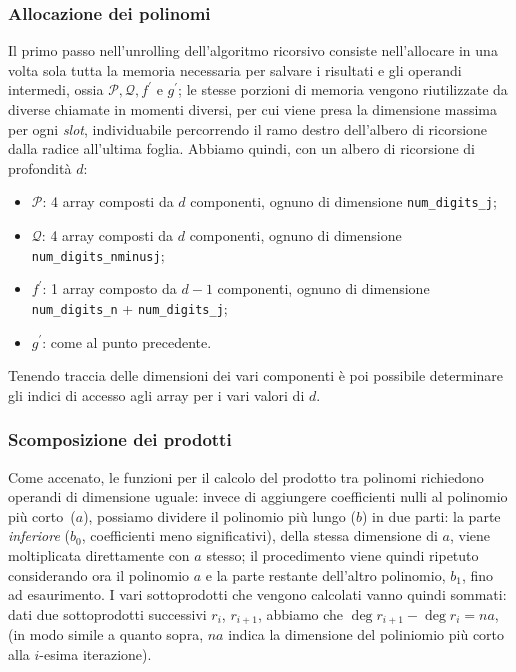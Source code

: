 \subsubsection*{Allocazione dei polinomi}
Il primo passo nell'unrolling dell'algoritmo ricorsivo consiste nell'allocare in una volta sola tutta la memoria necessaria per salvare
i risultati e gli operandi intermedi, ossia $ \mathcal{P}, \mathcal{Q}, f^{\prime}$ e $g^{\prime}$; le stesse porzioni di memoria vengono riutilizzate da diverse
chiamate in momenti diversi, per cui viene presa la dimensione massima per ogni \textit{slot}, individuabile percorrendo il ramo destro dell'albero di ricorsione
dalla radice all'ultima foglia. Abbiamo quindi, con un albero di ricorsione di profondità $d$:
\begin{itemize}
        \item $\mathcal{P}$: 4 array composti da $d$ componenti, ognuno di dimensione \texttt{num\_digits\_j};
        \item $\mathcal{Q}$: 4 array composti da $d$ componenti, ognuno di dimensione \texttt{num\_digits\_nminusj};
        \item $f^{\prime}$: 1 array composto da $d-1$ componenti, ognuno di dimensione \texttt{num\_digits\_n} + \texttt{num\_digits\_j};
        \item $g^{\prime}$: come al punto precedente.
\end{itemize}
Tenendo traccia delle dimensioni dei vari componenti è poi possibile determinare gli indici di accesso agli array per i vari valori di $d$.

\subsubsection*{Scomposizione dei prodotti}
Come accenato, le funzioni per il calcolo del prodotto tra polinomi richiedono operandi di dimensione uguale: invece di aggiungere coefficienti
nulli al polinomio più corto~($a$), possiamo dividere il polinomio più lungo ($b$) in due parti: la parte \textit{inferiore} ($b_{0}$, coefficienti meno significativi),
della stessa dimensione di $a$, viene moltiplicata direttamente con $a$ stesso; il procedimento viene quindi ripetuto considerando ora il polinomio $a$ e 
la parte restante dell'altro polinomio, $b_{1}$, fino ad esaurimento.
I vari sottoprodotti che vengono calcolati vanno quindi sommati: dati due sottoprodotti successivi $r_i$, $r_{i+1}$, abbiamo che $\deg{r_{i+1}}-\deg{r_i} = na$,
(in modo simile a quanto sopra, $na$ indica la dimensione del poliniomio più corto alla $i$-esima iterazione).

